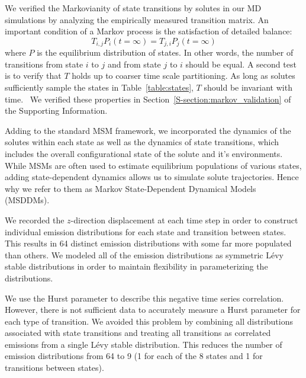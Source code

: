 \documentclass[12pt]{article}
\begin{document}
  We verified the Markovianity of state transitions by solutes in our MD simulations 
  by analyzing the empirically measured transition matrix. An important condition
  of a Markov process is the satisfaction of detailed balance:
  \begin{equation}
  T_{i,j}P_i(t=\infty) = T_{j,i}P_j(t=\infty)
  \end{equation}
  where $P$ is the equilibrium distribution of states. In other words, the number of
  transitions from state $i$ to $j$ and from state $j$ to $i$ should be equal. A second
  test is to verify that $T$ holds up to coarser time scale partitioning. As long as solutes
  sufficiently sample the states in Table~\ref{table:states}, $T$ should be invariant
  with time.~\cite{swope_describing_2004} We verified these properties 
  in Section~\ref{S-section:markov_validation} of the Supporting Information.
  
  Adding to the standard MSM framework, we incorporated the dynamics of the solutes
  within each state as well as the dynamics of state transitions, which includes the
  overall configurational state of the solute and it's environments. 
  While MSMs are often used to estimate equilibrium populations of various states, adding 
  state-dependent dynamics allows us to simulate solute trajectories.
  Hence why we refer to them as Markov State-Dependent Dynamical Models (MSDDMs). 
  
  We recorded the $z$-direction displacement at each time step in order to construct 
  individual emission distributions for each state and transition between states. 
  This results in 64 distinct emission distributions with some far more populated than
  others. We modeled all of the emission distributions as symmetric L\'evy stable 
  distributions in order to maintain flexibility in parameterizing the distributions.
  
  We use the Hurst parameter to describe this negative time series correlation.
  However, there is not sufficient data to accurately measure a Hurst parameter for 
  each type of transition. We avoided this problem by combining all distributions 
  associated with state transitions and treating all transitions as correlated
  emissions from a single L\'evy stable distribution. This reduces the number of emission
  distributions from 64 to 9 (1 for each of the 8 states and 1 for transitions between states).  
  
\end{document}
